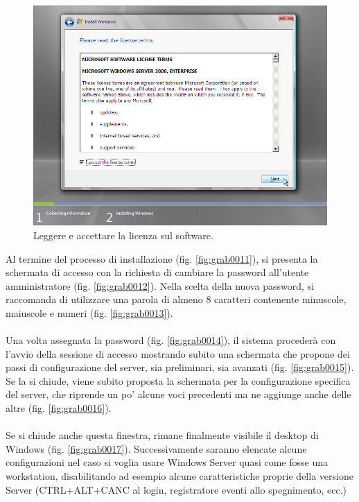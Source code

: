 \begin{figure}[htbp]
 \centering
 \includegraphics[scale=0.5]{images/grab0008}
 \caption{Leggere e accettare la licenza sul software.}
\label{fig:grab0008}
\end{figure}

\indent Al termine del processo di installazione (fig. \ref{fig:grab0011}), si presenta la schermata
di accesso con la richiesta di cambiare la password all’utente amministratore
(fig. \ref{fig:grab0012}). Nella scelta della nuova password, si raccomanda di utilizzare
una parola di almeno 8 caratteri contenente minuscole, maiuscole e numeri
(fig. \ref{fig:grab0013}). \\
\\ \indent Una volta assegnata la password (fig. \ref{fig:grab0014}), il sistema procederà con l’avvio
della sessione di accesso mostrando subito una schermata che propone
dei passi di configurazione del server, sia preliminari, sia avanzati (fig. \ref{fig:grab0015}).
Se la si chiude, viene subito proposta la schermata per la configurazione specifica
del server, che riprende un po’ alcune voci precedenti ma ne aggiunge
anche delle altre (fig. \ref{fig:grab0016}). \\
\\ \indent Se si chiude anche questa finestra, rimane finalmente visibile il desktop di
Windows (fig. \ref{fig:grab0017}). Successivamente saranno elencate alcune configurazioni
nel caso si voglia usare Windows Server quasi come fosse una workstation,
disabilitando ad esempio alcune caratteristiche proprie della versione Server
(CTRL+ALT+CANC al login, registratore eventi allo spegnimento, ecc.)

